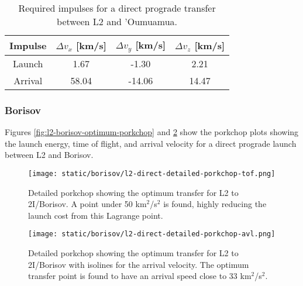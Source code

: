 \vspace{1cm}
\begin{table}[H]
  \centering
  \begin{tabular}{|c|c|c|c|}
    \hline
    Impulse & $\Delta v_x$ [km/s] & $\Delta v_y$ [km/s] & $\Delta v_z$ [km/s] \\
    \hline
    Launch & 1.67 & -1.30 & 2.21 \\
    \hline
    Arrival & 58.04 & -14.06 & 14.47 \\
    \hline
  \end{tabular}
    \caption[Required impulses for a direct prograde transfer between L2 and
    'Oumuamua]{Required impulses for a direct prograde transfer between L2 and
    'Oumuamua.}
  \label{tab:l2-oumuamua-direct-transfer-impulses}
\end{table}


\subsubsection{Borisov}

Figures \ref{fig:l2-borisov-optimum-porkchop} and
\ref{fig:l2-borisov-optimum-porkchop-avl} show the porkchop plots showing the
launch energy, time of flight, and arrival velocity for a direct prograde launch
between L2 and Borisov.

\begin{figure}[H]
  \centering
  \texttt{[image: static/borisov/l2-direct-detailed-porkchop-tof.png]}
        \caption[Detailed porkchop showing the optimum transfer for
        L2 to 2I/Borisov with the time of flight.]{Detailed porkchop showing the optimum transfer for
        L2 to 2I/Borisov. A point under 50 km$^2$/s$^2$ is found, highly
        reducing the launch cost from this Lagrange point.
  }
  \label{fig:l2-oumuamua-optimum-porkchop}
\end{figure}

\begin{figure}[H]
  \centering
  \texttt{[image: static/borisov/l2-direct-detailed-porkchop-avl.png]}
        \caption[Detailed porkchop showing the optimum transfer for
        L2 to 2I/Borisov with the arrival velocity.]{Detailed porkchop showing the
        optimum transfer for L2 to 2I/Borisov with isolines for the arrival
        velocity. The optimum transfer point is found to have an arrival speed
        close to 33 km$^2$/s$^2$.}
  \label{fig:l2-borisov-optimum-porkchop-avl}
\end{figure}

